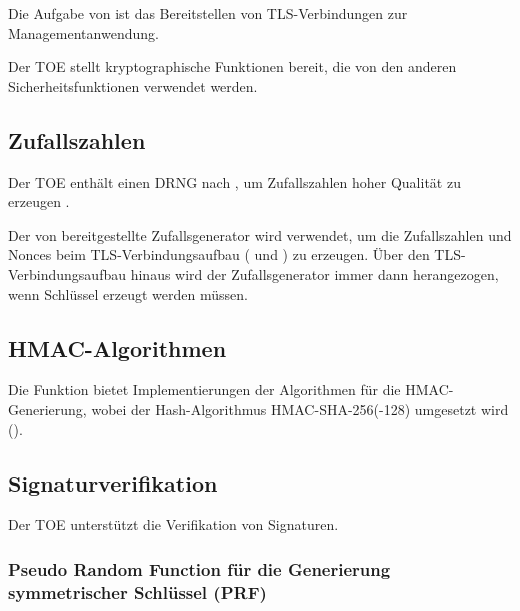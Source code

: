 %



Die Aufgabe von  ist das
Bereitstellen von TLS-Verbindungen zur Managementanwendung.

\sfbeschreibung{}

Der TOE stellt kryptographische Funktionen bereit, die von den anderen
Sicherheitsfunktionen verwendet werden.

\subsection{Zufallszahlen}%
\label{sf.cryptographicservices.rng}

Der TOE enthält einen DRNG nach , um
Zufallszahlen hoher Qualität zu erzeugen \autocite{SP80090A}.

Der von  bereitgestellte Zufallsgenerator wird
verwendet, um die Zufallszahlen und Nonces beim TLS-Verbindungsaufbau
( und ) zu erzeugen. Über den
TLS-Verbindungsaufbau hinaus wird der Zufallsgenerator immer dann herangezogen,
wenn Schlüssel erzeugt werden müssen.

\subsection{HMAC-Algorithmen}%
\label{sf.cryptographicservices.hmac}

Die Funktion bietet Implementierungen der Algorithmen für die
HMAC-Generierung, wobei der Hash-Algorithmus
HMAC-SHA-256(-128) umgesetzt wird ().

\subsection{Signaturverifikation}%
\label{sf.cryptographicservices.sigver}

Der TOE unterstützt die Verifikation von Signaturen.


\subsubsection{Pseudo Random Function für die Generierung
  symmetrischer Schlüssel (PRF)}%
\label{sf.cryptographicservices.ipsec.prf}


